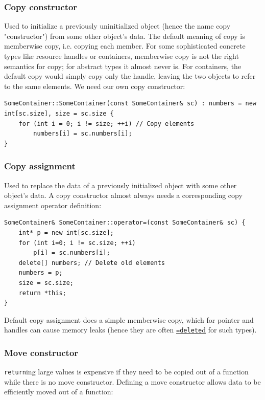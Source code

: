 \documentclass[table, xcdraw]{article}%
\begin{document}
\subsubsection{Copy constructor}

Used to initialize a previously uninitialized object (hence the name copy "constructor") from some other object's data. The default meaning of copy is memberwise copy, i.e. copying each member. For some sophisticated concrete types like resource handles or containers, memberwise copy is not the right semantics for copy; for abstract types it almost never is. For containers, the default copy would simply copy only the handle, leaving the two objects to refer to the same elements. We need our own copy constructor:

\begin{verbatim}
SomeContainer::SomeContainer(const SomeContainer& sc) : numbers = new int[sc.size], size = sc.size {
    for (int i = 0; i != size; ++i) // Copy elements
        numbers[i] = sc.numbers[i];
}
\end{verbatim}

\subsubsection{Copy assignment}

Used to replace the data of a previously initialized object with some other object's data. A copy constructor almost always needs a corresponding copy assignment operator definition:

\begin{verbatim}
SomeContainer& SomeContainer::operator=(const SomeContainer& sc) {
    int* p = new int[sc.size];
    for (int i=0; i != sc.size; ++i)
        p[i] = sc.numbers[i];
    delete[] numbers; // Delete old elements
    numbers = p;
    size = sc.size;
    return *this;
}
\end{verbatim}

Default copy assignment does a simple memberwise copy, which for pointer and handles can cause memory leaks (hence they are often \hyperref[isdelete]{\texttt{=delete}d} for such types).

\subsubsection{Move constructor} \label{moveconstructor}

\texttt{return}ing large values is expensive if they need to be copied out of a function while there is no move constructor. Defining a move constructor allows data to be efficiently moved out of a function:
\end{document}
